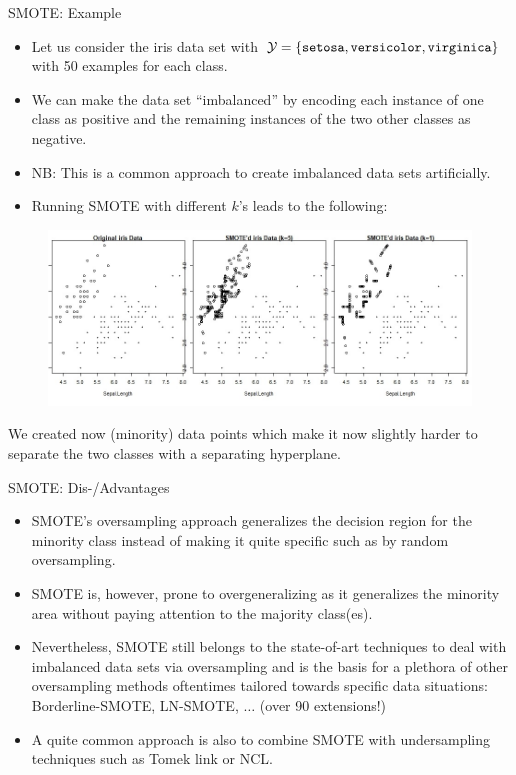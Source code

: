		
	\begin{frame}{SMOTE: Example}
		\footnotesize
		
		\begin{itemize}
			\item Let us consider the iris data set with $\mathcal{Y}=\{ \texttt{setosa},\texttt{versicolor},\texttt{virginica}  \}$ with 50 examples for each class.
%			
			\item We can make the data set ``imbalanced'' by encoding each instance of one class as positive and the remaining instances of the two other classes as negative.
%			
			\item [] NB: This is a common approach to create imbalanced data sets artificially.
%			
			\item Running SMOTE with different $k$'s leads to the following:
		\end{itemize}		
%		
		\begin{figure}
			\centering
			\includegraphics[width=0.8\linewidth]{figure_man/smoted_iris_data.jpeg}
		\end{figure}
		We created now (minority) data points which make it now slightly harder to separate the two classes with a separating hyperplane.
	\end{frame}


	\begin{frame}{SMOTE: Dis-/Advantages}
		\small
%		
		\begin{itemize}
			\item SMOTE's oversampling approach generalizes the decision region for the minority class instead of making it quite specific such as by random oversampling. 
			\item SMOTE is, however, prone to overgeneralizing as it generalizes the minority area without paying attention to the majority class(es).
			\item Nevertheless, SMOTE still belongs to the state-of-art techniques to deal with imbalanced data sets via oversampling and is the basis for a plethora of other oversampling methods oftentimes tailored towards specific data situations: Borderline-SMOTE, LN-SMOTE, $\ldots$ (over 90 extensions!)
%			
			\item A quite common approach is also to combine SMOTE with undersampling techniques such as Tomek link or NCL.
		\end{itemize}		
	\end{frame}

	\endlecture

